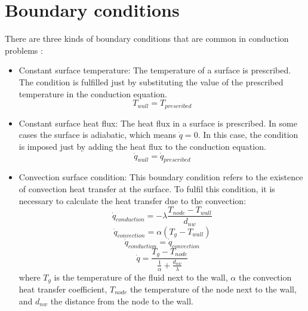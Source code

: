 \section{Boundary conditions}
There are three kinds of boundary conditions that are common in conduction problems \cite{Bergman2011}:
\begin{itemize}
	\item Constant surface temperature: The temperature of a surface is prescribed. The condition is fulfilled just by substituting the value of the prescribed temperature in the conduction equation.
	\begin{equation}
	T_{wall}=T_{prescribed}
	\end{equation}
	\item Constant surface heat flux: The heat flux in a surface is prescribed. In some cases the surface is adiabatic, which means $\dot{q}=0$. In this case, the condition is imposed just by adding the heat flux to the conduction equation.
	\begin{equation}
	\dot{q}_{wall}=\dot{q}_{prescribed}
	\end{equation}
	\item Convection surface condition: This boundary condition refers to the existence of convection heat transfer at the surface. To fulfil this condition, it is necessary to calculate the heat transfer due to the convection:
	\begin{equation}
	\dot{q}_{conduction}=-\lambda\frac{T_{node}-T_{wall}}{d_{nw}}
	\end{equation}
	\begin{equation}
	\dot{q}_{convection}=\alpha\left(T_{g}-T_{wall}\right)
	\end{equation}
	\begin{equation}
	\dot{q}_{conduction}=\dot{q}_{convection}
	\end{equation}
	\begin{equation}
	\dot{q}=\frac{T_{g}-T_{node}}{\frac{1}{\alpha}+\frac{d_{nw}}{\lambda}}
	\end{equation}
	where $T_{g}$ is the temperature of the fluid next to the wall, $\alpha$ the convection heat transfer coefficient, $T_{node}$ the temperature of the node next to the wall, and $d_{nw}$ the distance from the node to the wall.
\end{itemize}